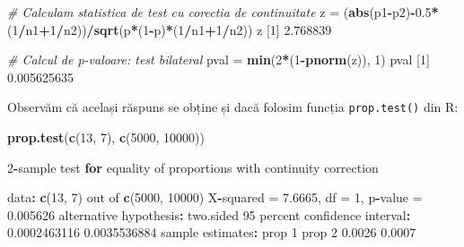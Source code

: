 \documentclass[]{article}
\newenvironment{Shaded}{\begin{snugshade}}{\end{snugshade}}
\newcommand{\KeywordTok}[1]{\textcolor[rgb]{0.13,0.29,0.53}{\textbf{#1}}}
\newcommand{\DecValTok}[1]{\textcolor[rgb]{0.00,0.00,0.81}{#1}}
\newcommand{\FloatTok}[1]{\textcolor[rgb]{0.00,0.00,0.81}{#1}}
\newcommand{\StringTok}[1]{\textcolor[rgb]{0.31,0.60,0.02}{#1}}
\newcommand{\CommentTok}[1]{\textcolor[rgb]{0.56,0.35,0.01}{\textit{#1}}}
\newcommand{\ControlFlowTok}[1]{\textcolor[rgb]{0.13,0.29,0.53}{\textbf{#1}}}
\newcommand{\OperatorTok}[1]{\textcolor[rgb]{0.81,0.36,0.00}{\textbf{#1}}}
\newcommand{\NormalTok}[1]{#1}
\begin{document}
\begin{Shaded}
\begin{Highlighting}[]
\CommentTok{# Calculam statistica de test cu corectia de continuitate}
\NormalTok{z =}\StringTok{ }\NormalTok{(}\KeywordTok{abs}\NormalTok{(p1}\OperatorTok{-}\NormalTok{p2)}\OperatorTok{-}\FloatTok{0.5}\OperatorTok{*}\NormalTok{(}\DecValTok{1}\OperatorTok{/}\NormalTok{n1}\OperatorTok{+}\DecValTok{1}\OperatorTok{/}\NormalTok{n2))}\OperatorTok{/}\KeywordTok{sqrt}\NormalTok{(p}\OperatorTok{*}\NormalTok{(}\DecValTok{1}\OperatorTok{-}\NormalTok{p)}\OperatorTok{*}\NormalTok{(}\DecValTok{1}\OperatorTok{/}\NormalTok{n1}\OperatorTok{+}\DecValTok{1}\OperatorTok{/}\NormalTok{n2))}
\NormalTok{z}
\NormalTok{[}\DecValTok{1}\NormalTok{] }\FloatTok{2.768839}

\CommentTok{# Calcul de p-valoare: test bilateral}
\NormalTok{pval =}\StringTok{ }\KeywordTok{min}\NormalTok{(}\DecValTok{2}\OperatorTok{*}\NormalTok{(}\DecValTok{1}\OperatorTok{-}\KeywordTok{pnorm}\NormalTok{(z)), }\DecValTok{1}\NormalTok{)}
\NormalTok{pval}
\NormalTok{[}\DecValTok{1}\NormalTok{] }\FloatTok{0.005625635}
\end{Highlighting}
\end{Shaded}

Observăm că același răspuns se obține și dacă folosim funcția
\texttt{prop.test()} din R:

\begin{Shaded}
\begin{Highlighting}[]
\KeywordTok{prop.test}\NormalTok{(}\KeywordTok{c}\NormalTok{(}\DecValTok{13}\NormalTok{, }\DecValTok{7}\NormalTok{), }\KeywordTok{c}\NormalTok{(}\DecValTok{5000}\NormalTok{, }\DecValTok{10000}\NormalTok{))}

    \DecValTok{2}\OperatorTok{-}\NormalTok{sample test }\ControlFlowTok{for}\NormalTok{ equality of proportions with continuity}
\NormalTok{    correction}

\NormalTok{data}\OperatorTok{:}\StringTok{  }\KeywordTok{c}\NormalTok{(}\DecValTok{13}\NormalTok{, }\DecValTok{7}\NormalTok{) out of }\KeywordTok{c}\NormalTok{(}\DecValTok{5000}\NormalTok{, }\DecValTok{10000}\NormalTok{)}
\NormalTok{X}\OperatorTok{-}\NormalTok{squared =}\StringTok{ }\FloatTok{7.6665}\NormalTok{, df =}\StringTok{ }\DecValTok{1}\NormalTok{, p}\OperatorTok{-}\NormalTok{value =}\StringTok{ }\FloatTok{0.005626}
\NormalTok{alternative hypothesis}\OperatorTok{:}\StringTok{ }\NormalTok{two.sided}
\DecValTok{95}\NormalTok{ percent confidence interval}\OperatorTok{:}
\StringTok{ }\FloatTok{0.0002463116} \FloatTok{0.0035536884}
\NormalTok{sample estimates}\OperatorTok{:}
\NormalTok{prop }\DecValTok{1}\NormalTok{ prop }\DecValTok{2} 
\FloatTok{0.0026} \FloatTok{0.0007} 
\end{Highlighting}
\end{Shaded}
\end{document}
